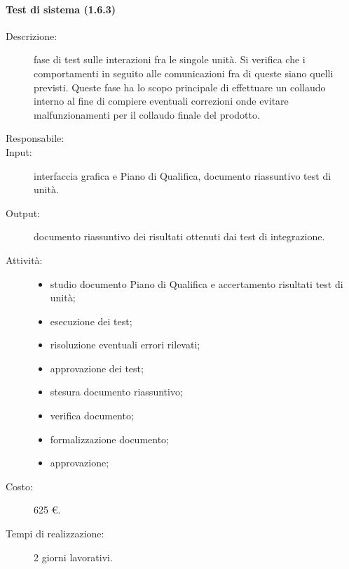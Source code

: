 \paragraph{Test di sistema (1.6.3)}  
\begin{description}
\item[Descrizione:] fase di test sulle interazioni fra le singole unità. Si verifica che i comportamenti in seguito alle comunicazioni fra di queste siano quelli previsti. Queste fase ha lo scopo principale di effettuare un collaudo interno al fine di compiere eventuali correzioni onde evitare malfunzionamenti per il collaudo finale del prodotto.
\item[Responsabile:] 
\item[Input:] interfaccia grafica e Piano di Qualifica, documento riassuntivo test di unità.
\item[Output:] documento riassuntivo dei risultati ottenuti dai test di integrazione.
\item[Attività:] 
\begin{center}
\begin{itemize}
\item studio documento Piano di Qualifica e accertamento risultati test di unità;
\item esecuzione dei test;
\item risoluzione eventuali errori rilevati;
\item approvazione dei test;
\item stesura documento riassuntivo;
\item verifica documento;
\item formalizzazione documento;
\item approvazione;
\end{itemize}
\end{center}
\item[Costo:] 625 \euro{}.
\item[Tempi di realizzazione:] 2 giorni lavorativi.
\end{description}

